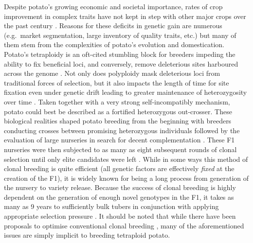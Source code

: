 Despite potato's growing economic and societal importance, rates of crop improvement in complex traits have not kept in step with other major crops over the past century \citep{Douches1996, Hirsch2013}. Reasons for these deficits in genetic gain are numerous (e.g.~market segmentation, large inventory of quality traits, etc.) but many of them stem from the complexities of potato's evolution and domestication. Potato's tetraploidy is an oft-cited stumbling block for breeders impeding the ability to fix beneficial loci, and conversely, remove deleterious sites harboured across the genome \citep{Lian2019, Zhang2019}. Not only does polyploidy mask deleterious loci from traditional forces of selection, but it also impacts the length of time for site fixation even under genetic drift leading to greater maintenance of heterozygosity over time \citep{Bartlett1934}. Taken together with a very strong self-incompatibly mechanism, potato could best be described as a fortified heterozygous out-crosser. These biological realities shaped potato breeding from the beginning with breeders conducting crosses between promising heterozygous individuals followed by the evaluation of large nurseries in search for decent complementation \citep{Simmonds1979}. These F1 nurseries were then subjected to as many as eight subsequent rounds of clonal selection until only elite candidates were left \citep{Bradshaw2017}. While in some ways this method of clonal breeding is quite efficient (all genetic factors are effectively \emph{fixed} at the creation of the F1), it is widely known for being a long process from generation of the nursery to variety release. Because the success of clonal breeding is highly dependent on the generation of enough novel genotypes in the F1, it takes as many as 9 years to sufficiently bulk tubers in conjunction with applying appropriate selection pressure \citep{Bryan1981, Tai1984}. It should be noted that while there have been proposals to optimise conventional clonal breeding \citep{Neele1991, Bradshaw2003}, many of the aforementioned issues are simply implicit to breeding tetraploid potato.

